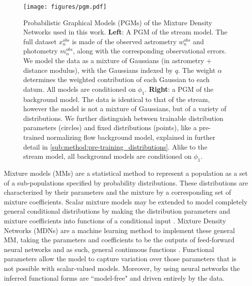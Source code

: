 \documentclass[twocolumn]{aastex631}
\begin{document}
        \begin{figure*}
            \centering
            \texttt{[image: figures/pgm.pdf]}
            \caption{%
                Probabilistic Graphical Models (PGMs) of the Mixture Density
                Networks used in this work.
                \textbf{Left}: A PGM of the stream model. The full dataset
                $x_n^{obs}$ is made of the observed astrometry $w_n^{obs}$ and
                photometry $m_n^{obs}$, along with the corresponding
                observational errors. We model the data as a mixture of
                Gaussians (in astrometry + distance modulus), with the Gaussians
                indexed by $q$. The weight $\alpha$ determines the weighted
                contribution of each Gaussian to each datum. All models are
                conditioned on $\phi_1$.
                \textbf{Right}: a PGM of the background model. The data is
                identical to that of the stream, however the model is not a
                mixture of Gaussians, but of a variety of distributions. We
                further distinguish between trainable distribution parameters
                (circles) and fixed distributions (points), like a pre-trained
                normalizing flow background model, explained in further detail
                in \autoref{sub:method:pre-training_distributions}. Alike to the
                stream model, all background models are conditioned on $\phi_1$.
            }
            \label{fig:PGM}
        \end{figure*}

        Mixture models (MMs) are a statistical method to represent a population
        as a set of a sub-populations specified by probability distributions.
        These distributions are characterized by their parameters and the
        mixture by a corresponding set of mixture coefficients. Scalar mixture
        models may be extended to model completely general conditional
        distributions by making the distribution parameters and mixture
        coefficients into functions of a conditional input
        \citep{McLachlanBasford1989}.  Mixture Density Networks (MDNs) are a
        machine learning method to implement these general MM, taking the
        parameters and coefficients to be the outputs of feed-forward neural
        networks and as such, general continuous functions \citep{Bishop1994}.
        Functional parameters allow the model to capture variation over those
        parameters that is not possible with scalar-valued models. Moreover, by
        using neural networks the inferred functional forms are ``model-free"
        and driven entirely by the data.
\end{document}
